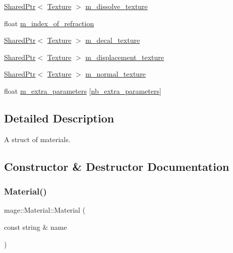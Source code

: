 \begin{DoxyCompactItemize}
\item 
\hyperlink{namespacemage_a1e01ae66713838a7a67d30e44c67703e}{Shared\+Ptr}$<$ \hyperlink{classmage_1_1_texture}{Texture} $>$ \hyperlink{structmage_1_1_material_aa68e02ed3da6000effc3aadcc99fa4b5}{m\+\_\+dissolve\+\_\+texture}
\item 
float \hyperlink{structmage_1_1_material_a8b584541ab8bfc527f856c68bb0152e7}{m\+\_\+index\+\_\+of\+\_\+refraction}
\item 
\hyperlink{namespacemage_a1e01ae66713838a7a67d30e44c67703e}{Shared\+Ptr}$<$ \hyperlink{classmage_1_1_texture}{Texture} $>$ \hyperlink{structmage_1_1_material_acdab45e5d78ddbb7f717d9db67ff3fcf}{m\+\_\+decal\+\_\+texture}
\item 
\hyperlink{namespacemage_a1e01ae66713838a7a67d30e44c67703e}{Shared\+Ptr}$<$ \hyperlink{classmage_1_1_texture}{Texture} $>$ \hyperlink{structmage_1_1_material_a04ca0a2efe12529ae0ea91e9cb622ade}{m\+\_\+displacement\+\_\+texture}
\item 
\hyperlink{namespacemage_a1e01ae66713838a7a67d30e44c67703e}{Shared\+Ptr}$<$ \hyperlink{classmage_1_1_texture}{Texture} $>$ \hyperlink{structmage_1_1_material_a18e56785d5ca3ae5a9b99c64e70622d6}{m\+\_\+normal\+\_\+texture}
\item 
float \hyperlink{structmage_1_1_material_a1918cc7a273b625dadb99c03307459fa}{m\+\_\+extra\+\_\+parameters} \mbox{[}\hyperlink{structmage_1_1_material_a91e2bfd0c66c244bbae0faddbee1119f}{nb\+\_\+extra\+\_\+parameters}\mbox{]}
\end{DoxyCompactItemize}


\subsection{Detailed Description}
A struct of materials. 

\subsection{Constructor \& Destructor Documentation}
\hypertarget{structmage_1_1_material_a0307d3bcf53c6ba270c8be4d127298db}{}\label{structmage_1_1_material_a0307d3bcf53c6ba270c8be4d127298db} 
\subsubsection{\texorpdfstring{Material()}{Material()}\hspace{0.1cm}{\footnotesize\ttfamily [1/3]}}
{\footnotesize\ttfamily mage\+::\+Material\+::\+Material (\begin{DoxyParamCaption}\item[{const string \&}]{name }\end{DoxyParamCaption})\hspace{0.3cm}{\ttfamily [explicit]}}

